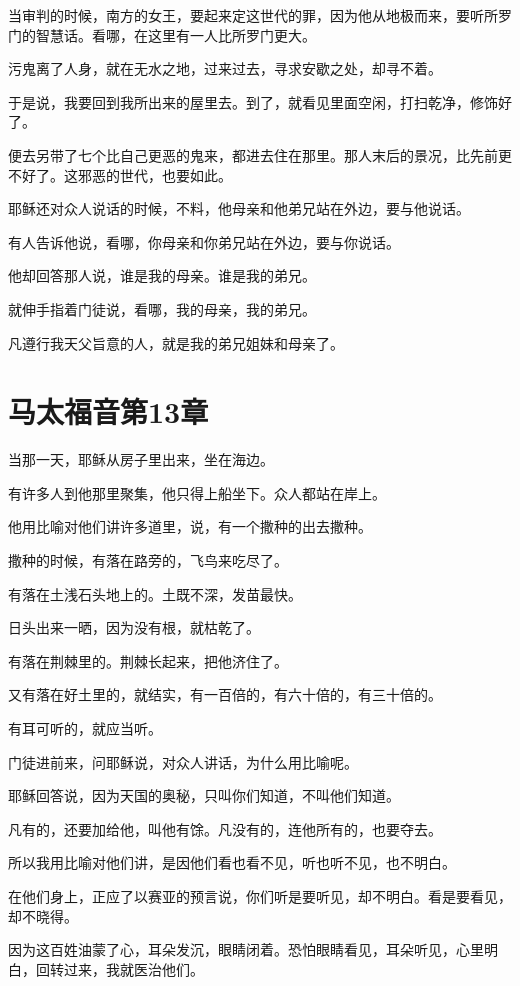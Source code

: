 \documentclass[12pt,oneside]{book}
\begin{document}
当审判的时候，南方的女王，要起来定这世代的罪，因为他从地极而来，要听所罗门的智慧话。看哪，在这里有一人比所罗门更大。

污鬼离了人身，就在无水之地，过来过去，寻求安歇之处，却寻不着。

于是说，我要回到我所出来的屋里去。到了，就看见里面空闲，打扫乾净，修饰好了。

便去另带了七个比自己更恶的鬼来，都进去住在那里。那人末后的景况，比先前更不好了。这邪恶的世代，也要如此。

耶稣还对众人说话的时候，不料，他母亲和他弟兄站在外边，要与他说话。

有人告诉他说，看哪，你母亲和你弟兄站在外边，要与你说话。

他却回答那人说，谁是我的母亲。谁是我的弟兄。

就伸手指着门徒说，看哪，我的母亲，我的弟兄。

凡遵行我天父旨意的人，就是我的弟兄姐妹和母亲了。

\chapter{马太福音第13章}
当那一天，耶稣从房子里出来，坐在海边。

有许多人到他那里聚集，他只得上船坐下。众人都站在岸上。

他用比喻对他们讲许多道里，说，有一个撒种的出去撒种。

撒种的时候，有落在路旁的，飞鸟来吃尽了。

有落在土浅石头地上的。土既不深，发苗最快。

日头出来一晒，因为没有根，就枯乾了。

有落在荆棘里的。荆棘长起来，把他济住了。

又有落在好土里的，就结实，有一百倍的，有六十倍的，有三十倍的。

有耳可听的，就应当听。

门徒进前来，问耶稣说，对众人讲话，为什么用比喻呢。

耶稣回答说，因为天国的奥秘，只叫你们知道，不叫他们知道。

凡有的，还要加给他，叫他有馀。凡没有的，连他所有的，也要夺去。

所以我用比喻对他们讲，是因他们看也看不见，听也听不见，也不明白。

在他们身上，正应了以赛亚的预言说，你们听是要听见，却不明白。看是要看见，却不晓得。

因为这百姓油蒙了心，耳朵发沉，眼睛闭着。恐怕眼睛看见，耳朵听见，心里明白，回转过来，我就医治他们。
\end{document}
